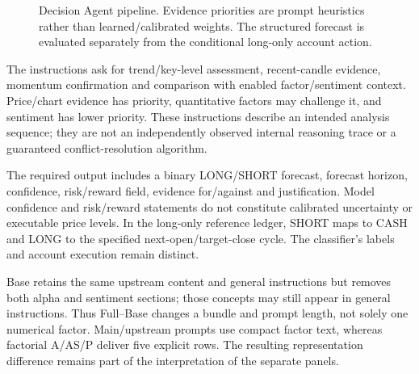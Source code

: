 \begin{figure}[!htbp]
\centering
\caption{Decision Agent pipeline. Evidence priorities are prompt heuristics rather than learned/calibrated weights. The structured forecast is evaluated separately from the conditional long-only account action.}
\label{fig:decision_agent}
\end{figure}

The instructions ask for trend/key-level assessment, recent-candle evidence, momentum confirmation and comparison with enabled factor/sentiment context. Price/chart evidence has priority, quantitative factors may challenge it, and sentiment has lower priority. These instructions describe an intended analysis sequence; they are not an independently observed internal reasoning trace or a guaranteed conflict-resolution algorithm.

The required output includes a binary LONG/SHORT forecast, forecast horizon, confidence, risk/reward field, evidence for/against and justification. Model confidence and risk/reward statements do not constitute calibrated uncertainty or executable price levels. In the long-only reference ledger, SHORT maps to CASH and LONG to the specified next-open/target-close cycle. The classifier's labels and account execution remain distinct.

Base retains the same upstream content and general instructions but removes both alpha and sentiment sections; those concepts may still appear in general instructions. Thus Full--Base changes a bundle and prompt length, not solely one numerical factor. Main/upstream prompts use compact factor text, whereas factorial A/AS/P deliver five explicit rows. The resulting representation difference remains part of the interpretation of the separate panels.
